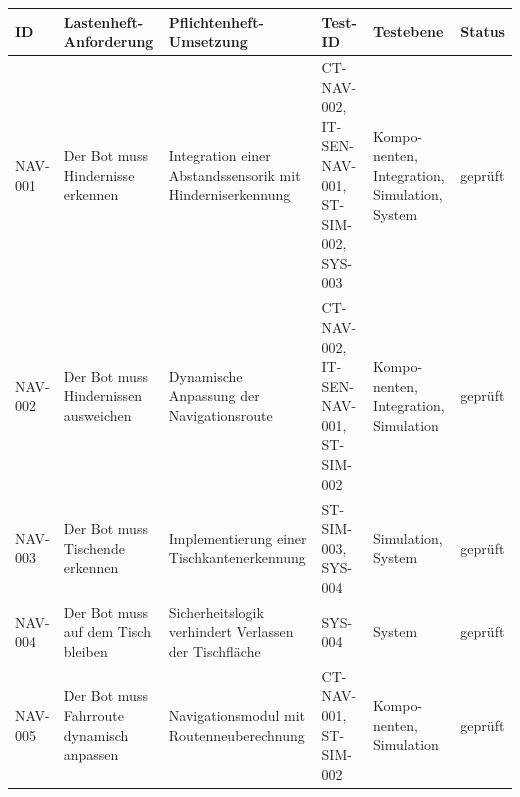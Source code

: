 \begin{longtable}[]{@{}
  >{\raggedright\arraybackslash}p{}
  >{\raggedright\arraybackslash}p{}
  >{\raggedright\arraybackslash}p{}
  >{\raggedright\arraybackslash}p{}
  >{\raggedright\arraybackslash}p{}
  >{\raggedright\arraybackslash}p{}@{}}
\toprule\noalign{}
\begin{minipage}[b]{\linewidth}\raggedright
ID
\end{minipage} & \begin{minipage}[b]{\linewidth}\raggedright
Lastenheft-Anforderung
\end{minipage} & \begin{minipage}[b]{\linewidth}\raggedright
Pflichtenheft-Umsetzung
\end{minipage} & \begin{minipage}[b]{\linewidth}\raggedright
Test-ID
\end{minipage} & \begin{minipage}[b]{\linewidth}\raggedright
Testebene
\end{minipage} & \begin{minipage}[b]{\linewidth}\raggedright
Status
\end{minipage} \\
\midrule\noalign{}
\endhead
\bottomrule\noalign{}
\endlastfoot
NAV-001 & Der Bot muss Hindernisse erkennen & Integration einer
Abstandssensorik mit Hinderniserkennung & CT-NAV-002, IT-SEN-NAV-001,
ST-SIM-002, SYS-003 & Kompo-nenten, Integration, Simulation, System &
geprüft \\
NAV-002 & Der Bot muss Hindernissen ausweichen & Dynamische Anpassung
der Navigationsroute & CT-NAV-002, IT-SEN-NAV-001, ST-SIM-002 &
Kompo-nenten, Integration, Simulation & geprüft \\
NAV-003 & Der Bot muss Tischende erkennen & Implementierung einer
Tischkantenerkennung & ST-SIM-003, SYS-004 & Simulation, System &
geprüft \\
NAV-004 & Der Bot muss auf dem Tisch bleiben & Sicherheitslogik
verhindert Verlassen der Tischfläche & SYS-004 & System & geprüft \\
NAV-005 & Der Bot muss Fahrroute dynamisch anpassen & Navigationsmodul
mit Routenneuberechnung & CT-NAV-001, ST-SIM-002 & Kompo-nenten,
Simulation & geprüft \\

\end{longtable}
